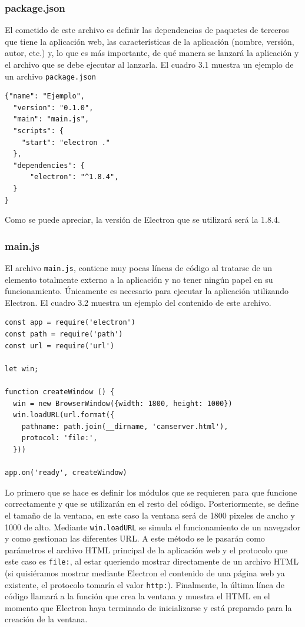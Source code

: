 \subsubsection{package.json}
El cometido de este archivo es definir las dependencias de paquetes de terceros que tiene la aplicación web, las características de la aplicación (nombre, versión, autor, etc.) y, lo que es más importante, de qué manera se lanzará la aplicación y el archivo que se debe ejecutar al lanzarla. El cuadro 3.1 muestra un ejemplo de un archivo \texttt{package.json}
\begin{lstlisting}[frame=single]
{"name": "Ejemplo",
  "version": "0.1.0",
  "main": "main.js",
  "scripts": {
    "start": "electron ."
  },
  "dependencies": {
      "electron": "^1.8.4",
  }
}
\end{lstlisting}

Como se puede apreciar, la versión de Electron que se utilizará será la 1.8.4.

\subsubsection{main.js}
El archivo \texttt{main.js}, contiene muy pocas líneas de código al tratarse de un elemento totalmente externo a la aplicación y no tener ningún papel en su funcionamiento. Únicamente es necesario para ejecutar la aplicación utilizando Electron. El cuadro 3.2 muestra un ejemplo del contenido de este archivo.

\begin{lstlisting}[frame=single]
const app = require('electron')
const path = require('path')
const url = require('url')

let win;

function createWindow () {
  win = new BrowserWindow({width: 1800, height: 1000})
  win.loadURL(url.format({
    pathname: path.join(__dirname, 'camserver.html'),
    protocol: 'file:',
  }))
  
app.on('ready', createWindow)

\end{lstlisting}

Lo primero que se hace es definir los módulos que se requieren para que funcione correctamente y que se utilizarán en el resto del código. Posteriormente, se define el tamaño de la ventana, en este caso la ventana será de 1800 pixeles de ancho y 1000 de alto. Mediante \texttt{win.loadURL} se simula el funcionamiento de un navegador y como gestionan las diferentes URL. A este método se le pasarán como parámetros el archivo HTML principal de la aplicación web y el protocolo que este caso es \texttt{file:}, al estar queriendo mostrar directamente de un archivo HTML (si quisiéramos mostrar mediante Electron el contenido de una página web ya existente, el protocolo tomaría el valor \texttt{http:}). Finalmente, la última línea de código llamará a la función que crea la ventana y muestra el HTML en el momento que Electron haya terminado de inicializarse y está preparado para la creación de la ventana.


